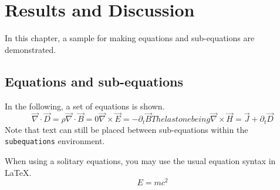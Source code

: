 \chapter{Results and Discussion}

In this chapter, a sample for making equations and sub-equations
are demonstrated.

\section{Equations and sub-equations}

\hspace{\parindent} In the following, a set of equations is shown.
\begin{subequations}
\newcommand\del{\overrightarrow{\nabla}}
\begin{equation}\label{eq:EGauss}
    \del \cdot \vec{D} = \rho
\end{equation}
\begin{equation}\label{eq:BGauss}
    \del \cdot \vec{B} = 0
\end{equation}
\begin{equation}\label{eq:Faraday}
    \del \times \vec{E} = -\partial_t \vec{B}
\end{equation}
The last one being
\begin{equation}\label{eq:Ampere-Maxwell}
    \del \times \vec{H} = \vec{J} + \partial_t \vec{D}
\end{equation}
\end{subequations}
Note that text can still be placed between sub-equations within
the \verb+subequations+ environment.

When using a solitary equations, you may use the usual equation
syntax in \LaTeX.
\begin{equation}\label{eq:Maxwell}
    E = mc^2
\end{equation}

\nocite{stein} 
\nocite{AppliedOptics}
\nocite{HandbookOfOptics2}